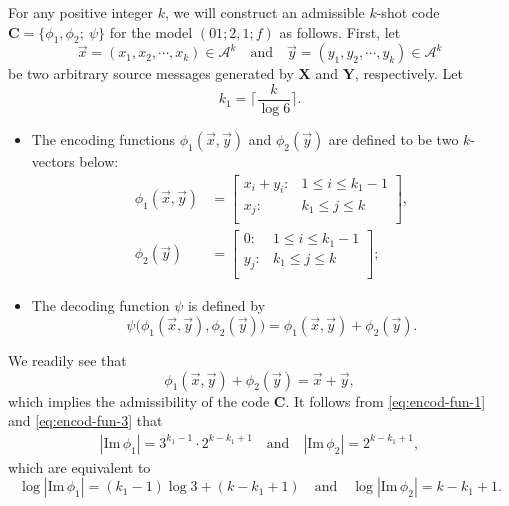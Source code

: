 \documentclass[11pt,draftclsnofoot,onecolumn]{IEEEtran}
\newcommand{\mbC}{\mathbf{C}}
\def\Im{\mathrm{Im}}
\begin{document}
For any positive integer $k$,
we will construct an admissible $k$-shot code $\mbC=\big\{\phi_1,\phi_2;~\psi\big\}$ for the model $(01;2,1;f)$ as follows. First, let
 \begin{equation*}
 \vec{x}=(x_1,x_2,\cdots,x_k)\in\mathcal{A}^k\quad \text{and}\quad \vec{y}=(y_1,y_2,\cdots,y_k)\in\mathcal{A}^k
 \end{equation*}
  be two arbitrary source messages generated by
 $\boldsymbol{X}$ and $\boldsymbol{Y}$, respectively. Let
\begin{equation}\label{eq:code-constr-k_1-k_2-k_3}
k_{1}=\bigg\lceil\frac{k}{\log6}\bigg\rceil.
 \end{equation}
 \begin{itemize}
\item The  encoding functions $\phi_{1}(\vec{x},\vec{y})$ and $\phi_{2}(\vec{y})$ are defined to be two $k$-vectors below:
\begin{align}
 \phi_{1}(\vec{x},\vec{y})& =
 \begin{bmatrix}
  x_{i}+y_{i}: & 1\leq i\leq k_{1}-1 \\
  x_{j}: & k_{1}\leq j\leq k\\
  \end{bmatrix},\label{eq:encod-fun-1}\\
 \phi_{2}(\vec{y})& =
 \begin{bmatrix}
 0: & 1\leq i\leq k_{1}-1 \\
 y_{j}: & k_{1}\leq j\leq k\\
 \end{bmatrix};\label{eq:encod-fun-3}
\end{align}
\item The decoding function $\psi$ is defined by
\begin{equation*}
		\psi\big( \phi_{1}(\vec{x},\vec{y}),\phi_{2}(\vec{y})\big)
=\phi_{1}(\vec{x},\vec{y})+\phi_{2}(\vec{y}).
\end{equation*}
\end{itemize}
We readily see that
\begin{equation*}
\phi_{1}(\vec{x},\vec{y})+\phi_{2}(\vec{y})=\vec{x}+\vec{y},
\end{equation*}
which implies the admissibility of
 the code  $\mbC$.
It follows from \eqref{eq:encod-fun-1} and \eqref{eq:encod-fun-3} that
\begin{align}
|\Im\,\phi_{1}|=3^{k_{1}-1}\cdot 2^{k-k_{1}+1}\quad \text{and} \quad |\Im\,\phi_{2}|= 2^{k-k_1+1},\nonumber
\end{align}
which are equivalent to
\begin{equation*}
\log|\Im\,\phi_{1}|=(k_{1}-1)\log3+(k-k_{1}+1)\quad\text{and}\quad \log|\Im\,\phi_{2}|=k-k_1+1.
\end{equation*}
\end{document}
